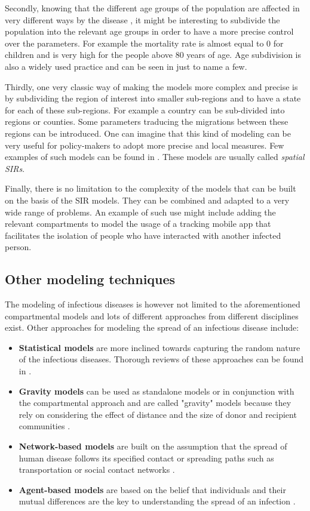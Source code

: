 \documentclass[12pt, letterpaper]{article}
\begin{document}
Secondly, knowing that the different age groups of the population are affected in very different ways by the disease \cite{agegroups}, it might be interesting to subdivide the population into the relevant age groups in order to have a more precise control over the parameters. For example the mortality rate is almost equal to 0 for children and is very high for the people above 80 years of age. Age subdivision is also a widely used practice and can be seen in \cite{age} just to name a few.

Thirdly, one very classic way of making the models more complex and precise is by subdividing the region of interest into smaller sub-regions and to have a state for each of these sub-regions. For example a country can be sub-divided into regions or counties. Some parameters traducing the migrations between these regions can be introduced. One can imagine that this kind of modeling can be very useful for policy-makers to adopt more precise and local measures. Few examples of such models can be found in \cite{spatial}. These models are usually called {\em spatial SIRs}. 

Finally, there is no limitation to the complexity of the models that can be built on the basis of the SIR models. They can be combined and adapted to a very wide range of problems. An example of such use might include adding the relevant compartments to model the usage of a tracking mobile app that facilitates the isolation of people who have interacted with another infected person.

\subsection{Other modeling techniques}

The modeling of infectious diseases is however not limited to the aforementioned compartmental models and lots of different approaches from different disciplines exist. Other approaches for modeling the spread of an infectious disease include:

\begin{itemize}

\item \textbf{Statistical models} are more inclined towards capturing the random nature of the infectious diseases. Thorough reviews of these approaches can be found in \cite{}.

\item \textbf{Gravity models} can be used as standalone models or in conjunction with the compartmental approach and are called "gravity" models because they rely on considering the effect of distance and the size of donor and recipient communities \cite{}. 

\item \textbf{Network-based models} are built on the assumption that the spread of human disease follows its specified contact or spreading paths such as transportation or social contact networks \cite{}.

\item \textbf{Agent-based models} are based on the belief that individuals and their mutual differences are the key to understanding the spread of an infection \cite{}.
\end{itemize}
\end{document}
